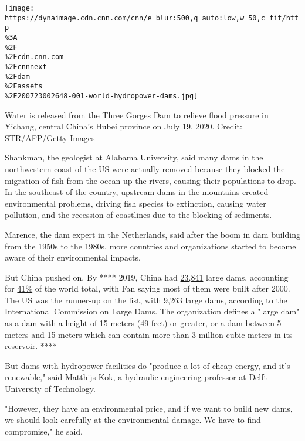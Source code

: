 \texttt{[image: https://dynaimage.cdn.cnn.com/cnn/e\_blur:500,q\_auto:low,w\_50,c\_fit/http\\\%3A\\\%2F\\\%2Fcdn.cnn.com\\\%2Fcnnnext\\\%2Fdam\\\%2Fassets\\\%2F200723002648-001-world-hydropower-dams.jpg]}

Water is released from the Three Gorges Dam to relieve flood pressure in
Yichang, central China's Hubei province on July 19, 2020. Credit:
STR/AFP/Getty Images

Shankman, the geologist at Alabama University, said many dams in the
northwestern coast of the US were actually removed because they blocked
the migration of fish from the ocean up the rivers, causing their
populations to drop. In the southeast of the country, upstream dams in
the mountains created environmental problems, driving fish species to
extinction, causing water pollution, and the recession of coastlines due
to the blocking of sediments.

Marence, the dam expert in the Netherlands, said after the boom in dam
building from the 1950s to the 1980s, more countries and organizations
started to become aware of their environmental impacts.

But China pushed on. By **** 2019, China had
\href{https://www.icold-cigb.org/article/GB/world_register/general_synthesis/number-of-dams-by-country-members}{23,841}
large dams, accounting for
\href{https://www.icold-cigb.org/article/GB/world_register/general_synthesis/general-synthesis}{41\%}
of the world total, with Fan saying most of them were built after 2000.
The US was the runner-up on the list, with 9,263 large dams, according
to the International Commission on Large Dams. The organization defines
a "large dam" as a dam with a height of 15 meters (49 feet) or greater,
or a dam between 5 meters and 15 meters which can contain more than 3
million cubic meters in its reservoir. ****

But dams with hydropower facilities do "produce a lot of cheap energy,
and it's renewable," said Matthijs Kok, a hydraulic engineering
professor at Delft University of Technology.

"However, they have an environmental price, and if we want to build new
dams, we should look carefully at the environmental damage. We have to
find compromise," he said.

